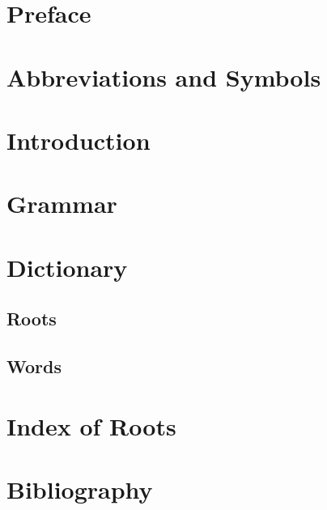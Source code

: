 \documentclass[paper=6in:9in]{scrbook}
\title{\PIE{Leg'tik''om}{noasterisk, circumflex}}
\author{A Proto-Indo-European Dictionary}
\date{Author}
\begin{document}
\frontmatter
\maketitle

\newpage

\tableofcontents
\newpage

\chapter{Preface}

\chapter{Abbreviations and Symbols}

\mainmatter
\chapter{Introduction}

\chapter{Grammar}

\chapter{Dictionary}

\section{Roots}




\section{Words}

\backmatter
\chapter{Index of Roots}

\chapter{Bibliography}


\end{document}

